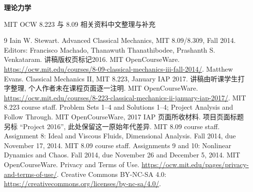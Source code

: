 \frontmatter
\begin{center}
{\color{structurecolor}\bfseries\fontsize{18}{25}\selectfont 理论力学\par}
\vspace{5pt}
MIT OCW 8.223 与 8.09 相关资料中文整理与补充
\end{center}

\originalcontents
\clearpage
\mainmatter





















\begin{thebibliography}{9}
 Iain W. Stewart. Advanced Classical Mechanics, MIT 8.09/8.309, Fall 2014. Editors: Francisco Machado, Thanawuth Thanathibodee, Prashanth S. Venkataram. 讲稿版权页标记2016. MIT OpenCourseWare. \url{https://ocw.mit.edu/courses/8-09-classical-mechanics-iii-fall-2014/}.
 Matthew Evans. Classical Mechanics II, MIT 8.223, January IAP 2017. 讲稿由听课学生打字整理, 个人作者未在课程页面逐一注明. MIT OpenCourseWare. \url{https://ocw.mit.edu/courses/8-223-classical-mechanics-ii-january-iap-2017/}.
 MIT 8.223 course staff. Problem Sets 1--4 and Solutions 1--4; Project Analysis and Follow Through. MIT OpenCourseWare, 2017 IAP 页面所收材料. 项目页面标题另标 ``Project 2016'', 此处保留这一原始年代差异.
 MIT 8.09 course staff. Assignment 8: Ideal and Viscous Fluids, Dimensional Analysis. Fall 2014, due November 17, 2014.
 MIT 8.09 course staff. Assignments 9 and 10: Nonlinear Dynamics and Chaos. Fall 2014, due November 26 and December 5, 2014.
 MIT OpenCourseWare. Privacy and Terms of Use. \url{https://ocw.mit.edu/pages/privacy-and-terms-of-use/}. Creative Commons BY-NC-SA 4.0: \url{https://creativecommons.org/licenses/by-nc-sa/4.0/}.
\end{thebibliography}

